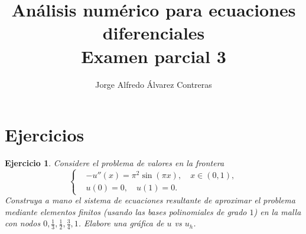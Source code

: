 \documentclass[11pt]{article}
\title{Análisis numérico para ecuaciones diferenciales \\
Examen parcial 3}
\author{Jorge Alfredo Álvarez Contreras}
\newtheorem{exercise}{Ejercicio}
\newcommand\<{\langle}
\renewcommand\>{\rangle}
\begin{document}
\maketitle

\section*{Ejercicios}

\begin{exercise}
  Considere el problema de valores en la frontera
  \begin{equation}
    \left\{
      \begin{aligned}
        &-u''(x) = \pi^{2}\sin(\pi x), \quad x\in(0,1),
        \\
        &u(0) = 0, \quad u(1)=0.
      \end{aligned}
    \right.
  \end{equation}
  Construya a mano el sistema de ecuaciones resultante de aproximar el
  problema mediante elementos finitos (usando las bases polinomiales
  de grado $1$) en la malla con nodos
  $0,\frac{1}{3},\frac{1}{2},\frac{3}{4},1$. Elabore una gráfica de
  $u$ vs $u_h$.
\end{exercise}
\end{document}
